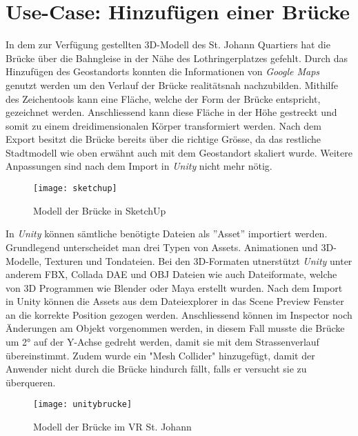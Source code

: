 \newpage
\section{Use-Case: Hinzufügen einer Brücke}\label{s.brücke}
In dem zur Verfügung gestellten 3D-Modell des St. Johann Quartiers hat die Brücke über die Bahngleise in der Nähe des Lothringerplatzes gefehlt. Durch das Hinzufügen des Geostandorts konnten die Informationen von \textit{Google Maps} genutzt werden um den Verlauf der Brücke realitätsnah nachzubilden. Mithilfe des Zeichentools kann eine Fläche, welche der Form der Brücke entspricht, gezeichnet werden. Anschliessend kann diese Fläche in der Höhe gestreckt und somit zu einem dreidimensionalen Körper transformiert werden. Nach dem Export besitzt die Brücke bereits über die richtige Grösse, da das restliche Stadtmodell wie oben erwähnt auch mit dem Geostandort skaliert wurde. Weitere Anpassungen sind nach dem Import in \textit{Unity} nicht mehr nötig.\\[6pt]

\begin{figure}[ht]
	\vspace{-20pt}
	\begin{center}
		\texttt{[image: sketchup]}
	\end{center}
	\vspace{-15pt}
	\caption{Modell der Brücke in SketchUp}\label{sketchup}
	\vspace{-12pt}
\end{figure}

\newpage
In \textit{Unity} können sämtliche benötigte Dateien als ''Asset'' importiert werden. Grundlegend unterscheidet man drei Typen von Assets. Animationen und 3D-Modelle, Texturen und Tondateien. Bei den 3D-Formaten utnerstützt \textit{Unity} unter anderem FBX, Collada DAE und OBJ Dateien wie auch Dateiformate, welche von 3D Programmen wie Blender oder Maya erstellt wurden. Nach dem Import in Unity können die Assets aus dem Dateiexplorer in das Scene Preview Fenster an die korrekte Position gezogen werden. Anschliessend können im Inspector noch Änderungen am Objekt vorgenommen werden, in diesem Fall musste die Brücke um 2° auf der Y-Achse gedreht werden, damit sie mit dem Strassenverlauf übereinstimmt. Zudem wurde ein "Mesh Collider" hinzugefügt, damit der Anwender nicht durch die Brücke hindurch fällt, falls er versucht sie zu überqueren.\\[6pt]
 
 \begin{figure}[ht]
 	\vspace{-20pt}
 	\begin{center}
 		\texttt{[image: unitybrucke]}
 	\end{center}
 	\vspace{-15pt}
 	\caption{Modell der Brücke im VR St. Johann}\label{unitybrücke}
 	\vspace{-12pt}
 \end{figure}

